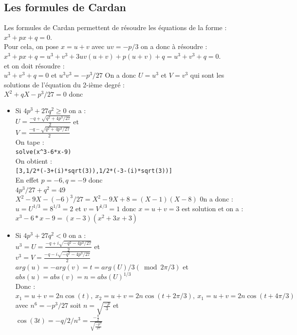 \documentclass[a4paper,11pt]{book}
\begin{document}
\subsection{Les formules de Cardan}
Les formules de Cardan permettent de r\'esoudre les \'equations de la forme :
$x^3+px+q=0$.\\
Pour cela, on pose $x=u+v$ avec $uv=-p/3$ on a donc \`a r\'esoudre :\\
$x^3+px+q=u^3+v^3+3uv(u+v)+p(u+v)+q=u^3+v^3+q=0$.\\
et on doit r\'esoudre :\\
$u^3+v^3+q=0$ et $u^3v^3=-p^3/27$
On a donc $U=u^3$ et $V=v^3$ qui sont les solutions de l'\'equation du 2-i\`eme 
degr\'e :\\
$X^2+qX-p^3/27=0$ donc \\
\begin{itemize}
\item Si $4p^3+27q^2 \geq 0$ on a :\\
$U=\frac{-q+\sqrt{q^2+4p^3/27}}{2}$ et\\
$V=\frac{-q-\sqrt{q^2+4p^3/27}}{2}$\\
On tape :\\
{\tt solve(x\verb|^|3-6*x-9)}\\
On obtient :\\
{\tt [3,1/2*(-3+(i)*sqrt(3)),1/2*(-3-(i)*sqrt(3))]}\\
En effet $p=-6, q=-9$ donc \\
$4p^3/27+q^2=49$\\
$X^2-9X-(-6)^3/27=X^2-9X+8=(X-1)(X-8)$
0n a donc :
$u=U^{1/3}=8^{1/3}=2$ et $v=V^{1/3}=1$
donc $x=u+v=3$ est solution et on a :\\
$x^3-6*x-9=(x-3)(x^2+3x+3)$
\item Si $4p^3+27q^2 <0$ on a :\\
$u^3=U=\frac{-q+i\sqrt{-q^2-4p^3/27}}{2}$ et\\
$v^3=V=\frac{-q-i\sqrt{-q^2-4p^3/27}}{2}$\\
$arg(u)=-arg(v)=t=arg(U)/3 (\bmod 2\pi/3)$ et $abs(u)=abs(v)=n=abs(U)^{1/3}$\\
Donc :\\
$x_1=u+v=2n\cos(t),\ x_2=u+v=2n\cos(t+2\pi/3),\ x_1=u+v=2n\cos(t+4\pi/3)$\\
avec $n^6=-p^3/27$ soit $n=\sqrt{\frac{-p}{3}}$ et\\ 
$\cos(3t)=-q/2/n^3=\frac{-\frac{q}{2}}{\sqrt{\frac{-p^3}{27}}}$\\
\end{itemize}
\end{document}
